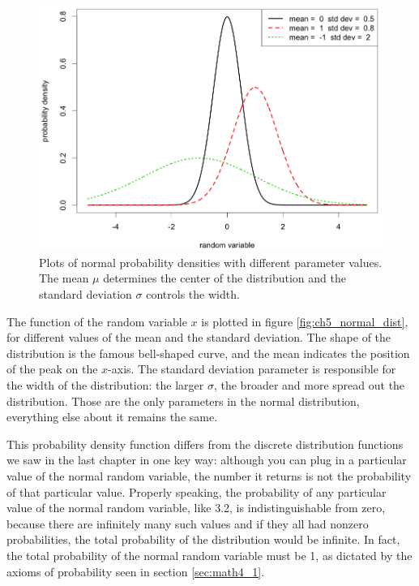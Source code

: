 \documentclass[
  letterpaper,
  DIV=11,
  numbers=noendperiod]{scrreprt}
\begin{document}
\begin{figure}

{\centering \includegraphics{./ch5/normal_dist_example.png}

}

\caption{Plots of normal probability densities with different parameter
values. The mean \(\mu\) determines the center of the distribution and
the standard deviation \(\sigma\) controls the width.}

\end{figure}

The function of the random variable \(x\) is plotted in figure
\ref{fig:ch5_normal_dist}, for different values of the mean and the
standard deviation. The shape of the distribution is the famous
bell-shaped curve, and the mean indicates the position of the peak on
the \(x\)-axis. The standard deviation parameter is responsible for the
width of the distribution: the larger \(\sigma\), the broader and more
spread out the distribution. Those are the only parameters in the normal
distribution, everything else about it remains the same.

This probability density function differs from the discrete distribution
functions we saw in the last chapter in one key way: although you can
plug in a particular value of the normal random variable, the number it
returns is not the probability of that particular value. Properly
speaking, the probability of any particular value of the normal random
variable, like 3.2, is indistinguishable from zero, because there are
infinitely many such values and if they all had nonzero probabilities,
the total probability of the distribution would be infinite. In fact,
the total probability of the normal random variable must be 1, as
dictated by the axioms of probability seen in section \ref{sec:math4_1}.
\end{document}
